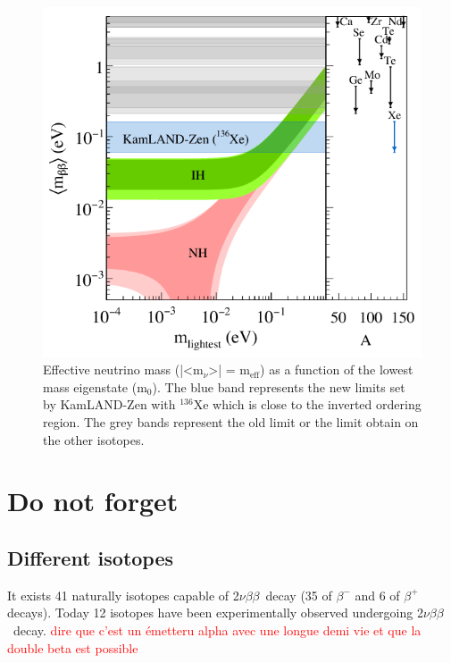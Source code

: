 \documentclass[main.tex]{subfiles}
\begin{document}
\begin{figure}[h!]
\begin{center}
\includegraphics[scale=0.60]{pictures/Chap2/KamLAND-Zen-results.png}
\caption{Effective neutrino mass (|<m$_{\nu}$>| = m$_{\text{eff}}$) as a function of the lowest mass eigenstate (m$_\text{0}$). The blue band represents the new limits set by KamLAND-Zen with $^{\text{136}}$Xe which is close to the inverted ordering region. The grey bands represent the old limit or the limit obtain on the other isotopes.}
\label{KamLAND-Zen-results}
\end{center}
\end{figure}

\FloatBarrier









\ifx
\section{Do not forget}
\subsection{Different isotopes}


\NI It exists 41 naturally isotopes capable of 2$\nu\beta\beta$~decay (35 of $\beta^{-}$ and 6 of $\beta^{+}$ decays). Today 12 isotopes have been experimentally observed undergoing 2$\nu\beta\beta$~decay. \textcolor{red}{dire que c'est un émetteru alpha avec une longue demi vie et que la double beta est possible}
\end{document}
